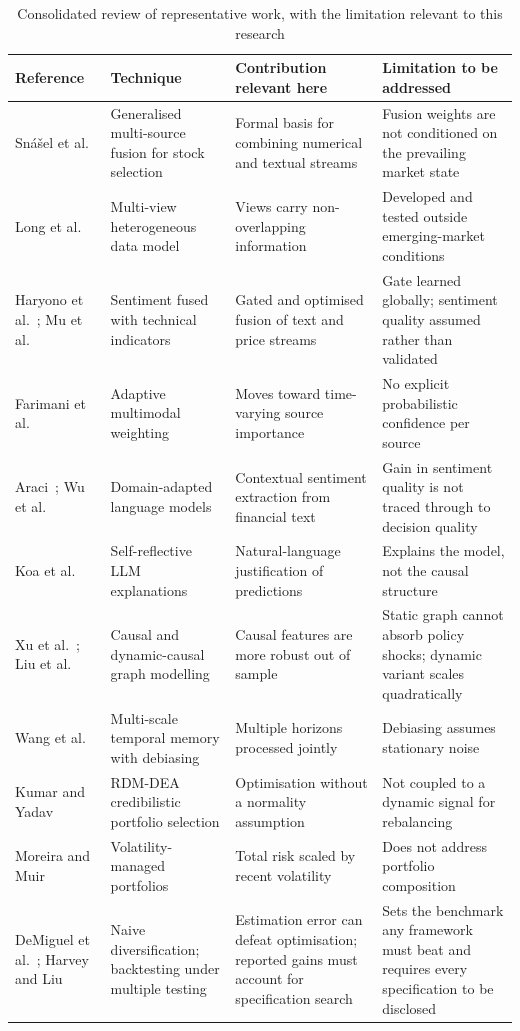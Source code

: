 \begin{table}[!htb]
\centering
\caption[Consolidated review of representative work]{Consolidated review of representative work, with the limitation relevant to
this research}
\label{tab:lit}
\tabfont
\begin{tabular}{@{}L{2.35cm}L{3.5cm}L{3.9cm}L{4.3cm}@{}}
\toprule
\textbf{Reference} & \textbf{Technique} & \textbf{Contribution relevant here} &
\textbf{Limitation to be addressed} \\
\midrule
Sn\'a\v{s}el et al.~\cite{snasel2024} & Generalised multi-source fusion for stock
selection & Formal basis for combining numerical and textual streams & Fusion weights are
not conditioned on the prevailing market state \\
Long et al.~\cite{long2024} & Multi-view heterogeneous data model & Views carry
non-overlapping information & Developed and tested outside emerging-market conditions \\
Haryono et al.~\cite{haryono2023}; Mu et al.~\cite{mu2023investor} & Sentiment fused with
technical indicators & Gated and optimised fusion of text and price streams & Gate learned
globally; sentiment quality assumed rather than validated \\
Farimani et al.~\cite{farimani2024} & Adaptive multimodal weighting & Moves toward
time-varying source importance & No explicit probabilistic confidence per source \\
Araci~\cite{araci2019}; Wu et al.~\cite{wu2023bloomberggpt} & Domain-adapted language
models & Contextual sentiment extraction from financial text & Gain in sentiment quality
is not traced through to decision quality \\
Koa et al.~\cite{koa2024} & Self-reflective LLM explanations & Natural-language
justification of predictions & Explains the model, not the causal structure \\
Xu et al.~\cite{xu2026causal}; Liu et al.~\cite{liu2026dynamic} & Causal and
dynamic-causal graph modelling & Causal features are more robust out of sample &
Static graph cannot absorb policy shocks; dynamic variant scales quadratically \\
Wang et al.~\cite{wang2025mtmd} & Multi-scale temporal memory with debiasing & Multiple
horizons processed jointly & Debiasing assumes stationary noise \\
Kumar and Yadav~\cite{kumar2024rdmdea} & RDM-DEA credibilistic portfolio selection &
Optimisation without a normality assumption & Not coupled to a dynamic signal for
rebalancing \\
Moreira and Muir~\cite{moreira2017} & Volatility-managed portfolios & Total risk scaled
by recent volatility & Does not address portfolio composition \\
DeMiguel et al.~\cite{demiguel2009}; Harvey and Liu~\cite{harvey2015} & Naive
diversification; backtesting under multiple testing & Estimation error can defeat
optimisation; reported gains must account for specification search & Sets the benchmark
any framework must beat and requires every specification to be disclosed \\
\bottomrule
\end{tabular}
\end{table}

